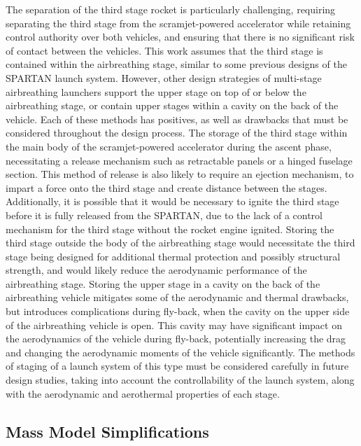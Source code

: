 The separation of the third stage rocket is particularly challenging, requiring separating the third stage from the scramjet-powered accelerator while retaining control authority over both vehicles, and ensuring that there is no significant risk of contact between the vehicles. This work assumes that the third stage is contained within the airbreathing stage, similar to some previous designs of the SPARTAN launch system\cite{Jazra2013}. However, other design strategies of multi-stage airbreathing launchers support the upper stage on top of\cite{Gong2014,Tsuchiya2005} or below\cite{Takahashi1997} the airbreathing stage, or contain upper stages within a cavity on the back of the vehicle\cite{Preller2017b,Mehta2001,Wilhite1991}. Each of these methods has positives, as well as drawbacks that must be considered throughout the design process.
The storage of the third stage within the main body of the scramjet-powered accelerator during the ascent phase, necessitating a release mechanism such as retractable panels or a hinged fuselage section. This method of release is also likely to require an ejection mechanism, to impart a force onto the third stage and create distance between the stages. Additionally, it is possible that it would be necessary to ignite the third stage before it is fully released from the SPARTAN, due to the lack of a control mechanism for the third stage without the rocket engine ignited. 
Storing the third stage outside the body of the airbreathing stage would necessitate the third stage being designed for additional thermal protection and possibly structural strength, and would likely reduce the aerodynamic performance of the airbreathing stage. Storing the upper stage in a cavity on the back of the airbreathing vehicle mitigates some of the aerodynamic and thermal drawbacks, but introduces complications during fly-back, when the cavity on the upper side of the airbreathing vehicle is open. This cavity may have significant impact on the aerodynamics of the vehicle during fly-back, potentially increasing the drag and changing the aerodynamic moments of the vehicle significantly. 
The methods of staging of a launch system of this type must be considered carefully in future design studies, taking into account the controllability of the launch system, along with the aerodynamic and aerothermal properties of each stage. 






\subsection{Mass Model Simplifications}


